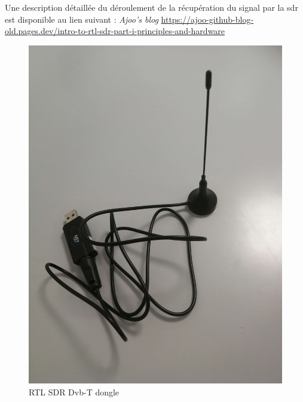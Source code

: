 \vspace{0.1cm}

Une description détaillée du déroulement de la récupération du signal par la sdr est disponible au lien suivant : \textit{Ajoo's blog} \href{https://ajoo-github-blog-old.pages.dev/intro-to-rtl-sdr-part-i-principles-and-hardware}{https://ajoo-github-blog-old.pages.dev/intro-to-rtl-sdr-part-i-principles-and-hardware}

\begin{figure}[h]
\centering

\includegraphics[scale=0.08]{images/dvbt.png}
\caption{RTL SDR Dvb-T dongle}\label{term31}
\end{figure}

